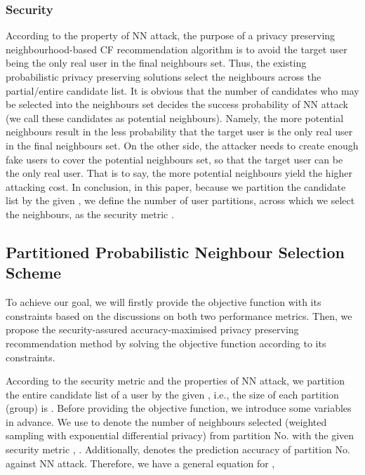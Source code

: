\documentclass[11pt]{article}
\begin{document}
\subsubsection{Security}
According to the property of NN attack, the purpose of a privacy preserving neighbourhood-based CF recommendation algorithm is to avoid the target user being the only real user in the final  neighbours set. Thus, the existing probabilistic privacy preserving solutions select the  neighbours across the partial/entire candidate list. It is obvious that the number of candidates who may be selected into the  neighbours set decides the success probability of NN attack (we call these candidates as potential neighbours). Namely, the more potential neighbours result in the less probability that the target user is the only real user in the final  neighbours set. On the other side, the attacker needs to create enough fake users to cover the potential neighbours set, so that the target user can be the only real user. That is to say, the more potential neighbours yield the higher attacking cost. In conclusion, in this paper, because we partition the candidate list by the given , we define the number of user partitions, across which we select the  neighbours, as the security metric .


\subsection{Partitioned Probabilistic Neighbour Selection Scheme}
To achieve our goal, we will firstly provide the objective function with its constraints based on the discussions on both two performance metrics. Then, we propose the security-assured accuracy-maximised privacy preserving recommendation method by solving the objective function according to its constraints.

According to the security metric  and the properties of NN attack, we partition the entire candidate list of a user by the given , i.e., the size of each partition (group) is . Before providing the objective function, we introduce some variables in advance. We use  to denote the number of neighbours selected (weighted sampling with exponential differential privacy) from partition No.  with the given security metric , . Additionally,  denotes the prediction accuracy of partition No.  against NN attack. Therefore, we have a general equation for ,
\end{document}
